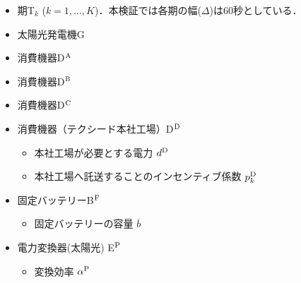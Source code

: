 \documentclass{jarticle}
\newcommand{\IB}{$\bullet$}
\newcommand{\IS}{$*$}
\begin{document}
\begin{itemize}
 \item[\IS] 期T$_k$ ($k=1,\ldots,K$)．本検証では各期の幅($\Delta$)は$60$秒としている．
 \item[\IS] 太陽光発電機G
 \item[\IS] 消費機器D$^{\rm A}$
 \item[\IS] 消費機器D$^{\rm B}$
 \item[\IS] 消費機器D$^{\rm C}$
 \item[\IS] 消費機器（テクシード本社工場）D$^{\rm D}$
   \begin{itemize}
   \item[\IB] 本社工場が必要とする電力 $d^{\rm D}$
   \item[\IB] 本社工場へ託送することのインセンティブ係数 $p^{\rm D}_{k}$   
  \end{itemize} 
 \item[\IS] 固定バッテリーB$^{\rm F}$
  \begin{itemize}
   \item[\IB] 固定バッテリーの容量 $\overline{b}$
  \end{itemize}
 \item[\IS] 電力変換器(太陽光) E$^{\rm P}$
  \begin{itemize}
   \item[\IB] 変換効率 $\alpha^{\rm P}$


\end{itemize}
\end{itemize}
\end{document}
